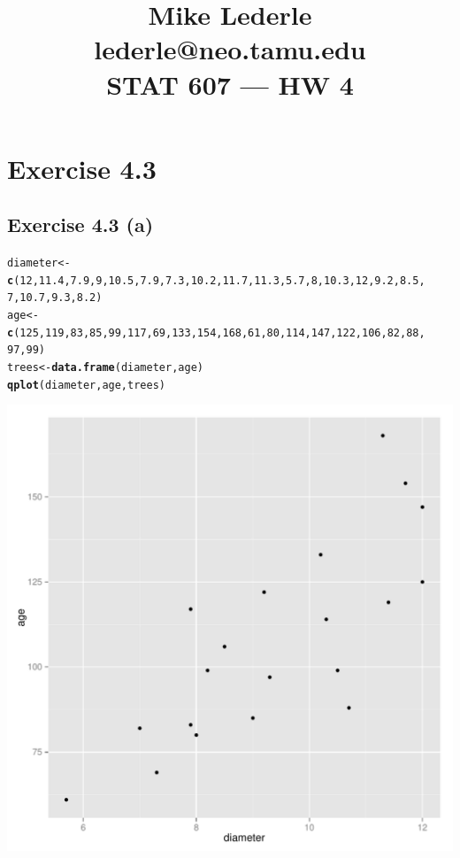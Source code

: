 \documentclass{article}\usepackage{graphicx, color}
\title{Mike Lederle\\lederle@neo.tamu.edu\\STAT 607 --- HW 4}
\makeatletter
\newcommand{\hlfunctioncall}[1]{\textcolor[rgb]{0.501960784313725,0,0.329411764705882}{\textbf{#1}}}%
\newenvironment{kframe}{%
 \def\at@end@of@kframe{}%
 \ifinner\ifhmode%
  \def\at@end@of@kframe{\end{minipage}}%
  \begin{minipage}{\columnwidth}%
 \fi\fi%
 \def\FrameCommand##1{\hskip\@totalleftmargin \hskip-\fboxsep
 \colorbox{shadecolor}{##1}\hskip-\fboxsep
     \hskip-\linewidth \hskip-\@totalleftmargin \hskip\columnwidth}%
 \MakeFramed {\advance\hsize-\width
   \@totalleftmargin\z@ \linewidth\hsize
   \@setminipage}}%
 {\par\unskip\endMakeFramed%
 \at@end@of@kframe}
\newenvironment{knitrout}{}{} %
\makeatother
\begin{document}
\maketitle
\section*{Exercise 4.3}
\subsection*{Exercise 4.3 (a)}
\begin{knitrout}
\color{fgcolor}\begin{kframe}
\begin{alltt}
diameter <- \hlfunctioncall{c}(12, 11.4, 7.9, 9, 10.5, 7.9, 7.3, 10.2, 11.7, 11.3, 5.7, 8, 10.3, 12, 9.2, 8.5, 
    7, 10.7, 9.3, 8.2)
age <- \hlfunctioncall{c}(125, 119, 83, 85, 99, 117, 69, 133, 154, 168, 61, 80, 114, 147, 122, 106, 82, 88, 
    97, 99)
trees <- \hlfunctioncall{data.frame}(diameter, age)
\hlfunctioncall{qplot}(diameter, age, trees)
\end{alltt}
\end{kframe}

{\centering \includegraphics[width=.45\textwidth]{figure/unnamed-chunk-1} 

}


\end{knitrout}
\end{document}
